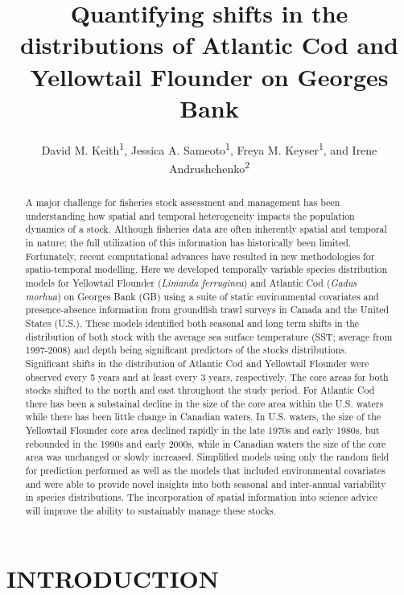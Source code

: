 \documentclass[
]{article}
\title{Quantifying shifts in the distributions of Atlantic Cod and Yellowtail Flounder on Georges Bank}
\author{David M. Keith\textsuperscript{1},
Jessica A. Sameoto\textsuperscript{1},
Freya M. Keyser\textsuperscript{1}, and
Irene Andrushchenko\textsuperscript{2}}
\date{}
\begin{document}
\maketitle
\begin{abstract}
A major challenge for fisheries stock assessment and management has been understanding how spatial and temporal heterogeneity impacts the population dynamics of a stock. Although fisheries data are often inherently spatial and temporal in nature; the full utilization of this information has historically been limited. Fortunately, recent computational advances have resulted in new methodologies for spatio-temporal modelling. Here we developed temporally variable species distribution models for Yellowtail Flounder (\emph{Limanda ferruginea}) and Atlantic Cod (\emph{Gadus morhua}) on Georges Bank (GB) using a suite of static environmental covariates and presence-absence information from groundfish trawl surveys in Canada and the United States (U.S.). These models identified both seasonal and long term shifts in the distribution of both stock with the average sea surface temperature (SST; average from 1997-2008) and depth being significant predictors of the stocks distributions. Significant shifts in the distribution of Atlantic Cod and Yellowtail Flounder were observed every 5 years and at least every 3 years, respectively. The core areas for both stocks shifted to the north and east throughout the study period. For Atlantic Cod there has been a substainal decline in the size of the core area within the U.S. waters while there has been little change in Canadian waters. In U.S. waters, the size of the Yellowtail Flounder core area declined rapidly in the late 1970s and early 1980s, but rebounded in the 1990s and early 2000s, while in Canadian waters the size of the core area was unchanged or slowly increased. Simplified models using only the random field for prediction performed as well as the models that included environmental covariates and were able to provide novel insights into both seasonal and inter-annual variability in species distributions. The incorporation of spatial information into science advice will improve the ability to sustainably manage these stocks.
\end{abstract}

\hypertarget{ref-intro}{%
\section{INTRODUCTION}\label{ref-intro}}
\end{document}
